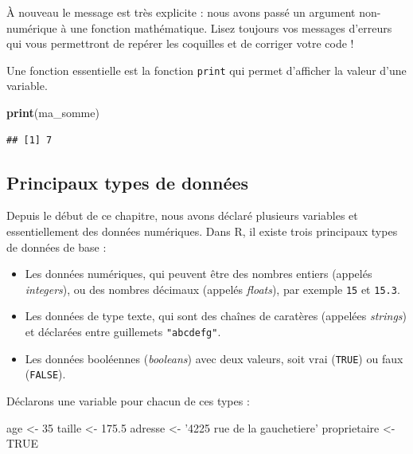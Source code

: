\documentclass[
  11pt,
  french,
]{book}
\makeatletter
\newenvironment{Shaded}{\begin{snugshade}}{\end{snugshade}}
\newcommand{\DecValTok}[1]{\textcolor[rgb]{0.00,0.00,0.81}{#1}}
\newcommand{\FloatTok}[1]{\textcolor[rgb]{0.00,0.00,0.81}{#1}}
\newcommand{\KeywordTok}[1]{\textcolor[rgb]{0.13,0.29,0.53}{\textbf{#1}}}
\newcommand{\NormalTok}[1]{#1}
\newcommand{\OtherTok}[1]{\textcolor[rgb]{0.56,0.35,0.01}{#1}}
\newcommand{\StringTok}[1]{\textcolor[rgb]{0.31,0.60,0.02}{#1}}
\providecommand{\tightlist}{%
  \setlength{\itemsep}{0pt}\setlength{\parskip}{0pt}}
\newenvironment{kframe}{%
\medskip{}
\setlength{\fboxsep}{.8em}
 \def\at@end@of@kframe{}%
 \ifinner\ifhmode%
  \def\at@end@of@kframe{\end{minipage}}%
  \begin{minipage}{\columnwidth}%
 \fi\fi%
 \def\FrameCommand##1{\hskip\@totalleftmargin \hskip-\fboxsep
 \colorbox{shadecolor}{##1}\hskip-\fboxsep
     \hskip-\linewidth \hskip-\@totalleftmargin \hskip\columnwidth}%
 \MakeFramed {\advance\hsize-\width
   \@totalleftmargin\z@ \linewidth\hsize
   \@setminipage}}%
 {\par\unskip\endMakeFramed%
 \at@end@of@kframe}
\renewenvironment{Shaded}{\begin{kframe}}{\end{kframe}}
\makeatother
\begin{document}
À nouveau le message est très explicite : nous avons passé un argument non-numérique à une fonction mathématique. Lisez toujours vos messages d'erreurs qui vous permettront de repérer les coquilles et de corriger votre code !

Une fonction essentielle est la fonction \texttt{print} qui permet d'afficher la valeur d'une variable.

\begin{Shaded}
\begin{Highlighting}[]
\KeywordTok{print}\NormalTok{(ma_somme)}
\end{Highlighting}
\end{Shaded}

\begin{verbatim}
## [1] 7
\end{verbatim}

\hypertarget{sect0134}{%
\subsection{Principaux types de données}\label{sect0134}}

Depuis le début de ce chapitre, nous avons déclaré plusieurs variables et essentiellement des données numériques. Dans R, il existe trois principaux types de données de base :

\begin{itemize}
\tightlist
\item
  Les données numériques, qui peuvent être des nombres entiers (appelés \emph{integers}), ou des nombres décimaux (appelés \emph{floats}), par exemple \texttt{15} et \texttt{15.3}.
\item
  Les données de type texte, qui sont des chaînes de caratères (appelées \emph{strings}) et déclarées entre guillemets \texttt{"abcdefg"}.
\item
  Les données booléennes (\emph{booleans}) avec deux valeurs, soit vrai (\texttt{TRUE}) ou faux (\texttt{FALSE}).
\end{itemize}

Déclarons une variable pour chacun de ces types :

\begin{Shaded}
\begin{Highlighting}[]
\NormalTok{age <-}\StringTok{ }\DecValTok{35}
\NormalTok{taille <-}\StringTok{ }\FloatTok{175.5}
\NormalTok{adresse <-}\StringTok{ '4225 rue de la gauchetiere'}
\NormalTok{proprietaire <-}\StringTok{ }\OtherTok{TRUE}
\end{Highlighting}
\end{Shaded}
\end{document}

